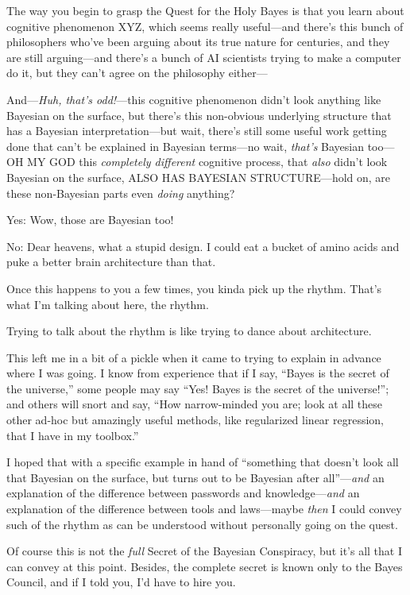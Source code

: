 {
 The way you begin to grasp the Quest for the Holy Bayes is that
you learn about cognitive phenomenon XYZ, which seems really
useful---and there's this bunch of philosophers
who've been arguing about its true nature for
centuries, and they are still arguing---and there's a
bunch of AI scientists trying to make a computer do it, but they
can't agree on the philosophy either---}

{
 And---\textit{Huh, that's odd!}{}---this cognitive
phenomenon didn't look anything like Bayesian on the
surface, but there's this non-obvious underlying
structure that has a Bayesian interpretation---but wait,
there's still some useful work getting done that
can't be explained in Bayesian terms---no wait,
\textit{that's} Bayesian too---OH MY GOD this
\textit{completely different} cognitive process, that \textit{also}
didn't look Bayesian on the surface, ALSO HAS BAYESIAN
STRUCTURE---hold on, are these non-Bayesian parts even \textit{doing}
anything?}

{
 Yes: Wow, those are Bayesian too!}

{
 No: Dear heavens, what a stupid design. I could eat a bucket of
amino acids and puke a better brain architecture than that.}

{
 Once this happens to you a few times, you kinda pick up the
rhythm. That's what I'm talking about
here, the rhythm.}

{
 Trying to talk about the rhythm is like trying to dance about
architecture.}

{
 This left me in a bit of a pickle when it came to trying to
explain in advance where I was going. I know from experience that if I
say, ``Bayes is the secret of the
universe,'' some people may say
``Yes! Bayes is the secret of the
universe!''; and others will snort and say,
``How narrow-minded you are; look at all these other
ad-hoc but amazingly useful methods, like regularized linear
regression, that I have in my toolbox.''}

{
 I hoped that with a specific example in hand of
``something that doesn't look all that
Bayesian on the surface, but turns out to be Bayesian after
all''---\textit{and} an explanation of the difference
between passwords and knowledge---\textit{and} an explanation of the
difference between tools and laws---maybe \textit{then} I could convey
such of the rhythm as can be understood without personally going on the
quest.}

{
 Of course this is not the \textit{full} Secret of the Bayesian
Conspiracy, but it's all that I can convey at this
point. Besides, the complete secret is known only to the Bayes Council,
and if I told you, I'd have to hire you.}

